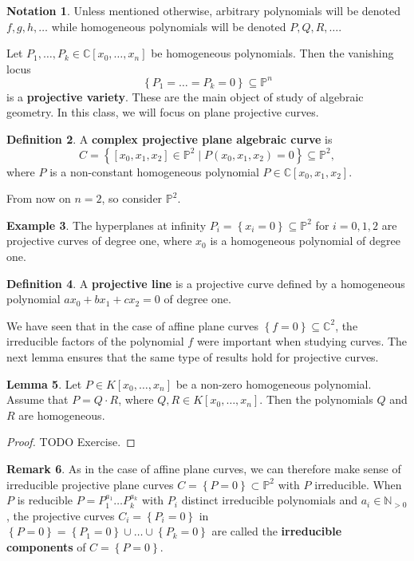 \documentclass{article}
\newcommand{\N}{\mathbb{N}}
\newcommand{\C}{\mathbb{C}}
\renewcommand{\P}{\mathbb{P}}
\newcommand{\rb}[1]{\left( #1 \right)}
\renewcommand{\sb}[1]{\left[ #1 \right]}
\newcommand{\cb}[1]{\left\{ #1 \right\}}
\theoremstyle{definition}\newtheorem{definition}{Definition}[section]
\theoremstyle{definition}\newtheorem{notation}[definition]{Notation}
\theoremstyle{definition}\newtheorem{remark}[definition]{Remark}
\theoremstyle{definition}\newtheorem{example}[definition]{Example}
\theoremstyle{definition}\newtheorem{fact}{Fact}
\theoremstyle{definition}\newtheorem{exercise}{Exercise}
\newtheorem{lemma}[definition]{Lemma}
\begin{document}
\begin{notation}
Unless mentioned otherwise, arbitrary polynomials will be denoted $ f, g, h, \dots $ while homogeneous polynomials will be denoted $ P, Q, R, \dots $.
\end{notation}

Let $ P_1, \dots, P_k \in \C\sb{x_0, \dots, x_n} $ be homogeneous polynomials. Then the vanishing locus
$$ \cb{P_1 = \dots = P_k = 0} \subseteq \P^n $$
is a \textbf{projective variety}. These are the main object of study of algebraic geometry. In this class, we will focus on plane projective curves.

\begin{definition}
A \textbf{complex projective plane algebraic curve} is
$$ C = \cb{\sb{x_0, x_1, x_2} \in \P^2 \mid P\rb{x_0, x_1, x_2} = 0} \subseteq \P^2, $$
where $ P $ is a non-constant homogeneous polynomial $ P \in \C\sb{x_0, x_1, x_2} $.
\end{definition}

From now on $ n = 2 $, so consider $ \P^2 $.

\begin{example}
The hyperplanes at infinity $ P_i = \cb{x_i = 0} \subseteq \P^2 $ for $ i = 0, 1, 2 $ are projective curves of degree one, where $ x_0 $ is a homogeneous polynomial of degree one.
\end{example}

\begin{definition}
A \textbf{projective line} is a projective curve defined by a homogeneous polynomial $ ax_0 + bx_1 + cx_2 = 0 $ of degree one.
\end{definition}

We have seen that in the case of affine plane curves $ \cb{f = 0} \subseteq \C^2 $, the irreducible factors of the polynomial $ f $ were important when studying curves. The next lemma ensures that the same type of results hold for projective curves.

\begin{lemma}
Let $ P \in K\sb{x_0, \dots, x_n} $ be a non-zero homogeneous polynomial. Assume that $ P = Q \cdot R $, where $ Q, R \in K\sb{x_0, \dots, x_n} $. Then the polynomials $ Q $ and $ R $ are homogeneous.
\end{lemma}

\begin{proof}
TODO Exercise.
\end{proof}

\begin{remark}
As in the case of affine plane curves, we can therefore make sense of irreducible projective plane curves $ C = \cb{P = 0} \subset \P^2 $ with $ P $ irreducible. When $ P $ is reducible $ P = P_1^{a_1} \dots P_k^{a_k} $ with $ P_i $ distinct irreducible polynomials and $ a_i \in \N_{> 0} $, the projective curves $ C_i = \cb{P_i = 0} $ in $ \cb{P = 0} = \cb{P_1 = 0} \cup \dots \cup \cb{P_k = 0} $ are called the \textbf{irreducible components} of $ C = \cb{P = 0} $.
\end{remark}
\end{document}
